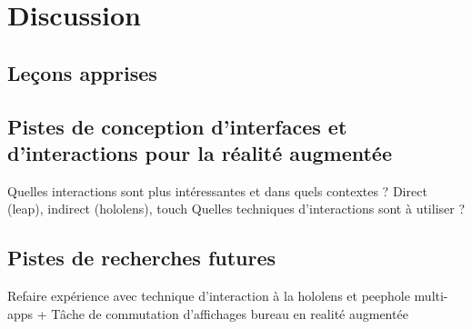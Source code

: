 \chapter{Discussion}
\section{Leçons apprises}



\section{Pistes de conception d'interfaces et d'interactions pour la réalité augmentée}
Quelles interactions sont plus intéressantes et dans quels contextes ? Direct (leap), indirect (hololens), touch
Quelles techniques d'interactions sont à utiliser ?



\section{Pistes de recherches futures}
Refaire expérience avec technique d'interaction à la hololens et peephole
multi-apps + Tâche de commutation d'affichages
bureau en realité augmentée